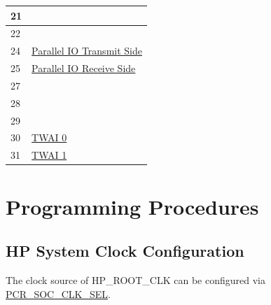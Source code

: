 \documentclass[main\_\_EN.tex]{subfiles}
\begin{document}
\begin{table}[H]
\begin{tabular}{|l|l|}
21                                  &    \nameref{mod:rmt}            \\ \hline
22                                  &    \nameref{mod:mcpwm}            \\ \hline
24                                  &    \hyperref[mod:parlio]{Parallel IO Transmit Side}            \\ \hline
25                                  &    \hyperref[mod:parlio]{Parallel IO Receive Side}             \\ \hline
27                                  &     \nameref{mod:ledpwm}           \\ \hline
28                                  &     \nameref{mod:iomuxgpio}           \\ \hline
29                                  &     \nameref{mod:i2c}           \\ \hline
30                                  &       \hyperref[mod:twai]{TWAI 0}         \\ \hline
31                                  &       \hyperref[mod:twai]{TWAI 1}         \\ \hline
\end{tabular}
\end{table}




\section{Programming Procedures}
\label{sec:alias-prog-procedures}

\subsection{HP System Clock Configuration}

The clock source of HP\_ROOT\_CLK can be configured via \hyperref[fielddesc:PCRSOCCLKSEL]{PCR\_SOC\_CLK\_SEL}.
\end{document}
